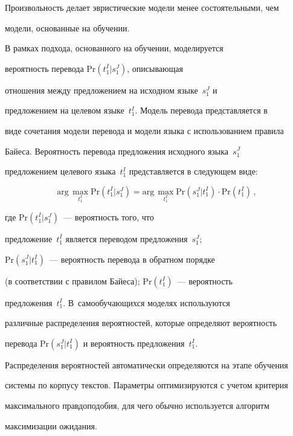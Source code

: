 Произвольность делает эвристические модели менее состоятельными, чем


модели, основанные на обучении.





     В рамках подхода, основанного на обучении, моделируется


вероятность перевода $\mathrm{Pr}\left( t_1^I\vert s_1^J\right)$, описывающая


отношения между предложением на исходном языке~$s_1^J$ и


предложением на целевом языке~$t_1^I$. Модель перевода представляется в


виде сочетания модели перевода и модели языка с использованием правила


Байеса. Вероятность перевода предложения исходного языка~$s_1^J$


предложением целевого языка~$t_1^I$ представляется в следующем виде:


     $$


     \mathrm{arg}\,\max_{t_1^I} \mathrm{Pr}\left( t_1^I\vert s_1^J\right) =


\mathrm{arg}\,\max_{t_1^I} \mathrm{Pr}\left( s_1^J\vert t_1^I\right)\cdot


\mathrm{Pr}(t_1^I)\,,


     $$


где $\mathrm{Pr}\left( t_1^I\vert s_1^J\right)$~--- вероятность того, что


предложение~$t_1^I$ является переводом предложения~$s_1^J$;


$\mathrm{Pr}(s_1^J\vert t_1^I)$~--- вероятность перевода в обратном порядке


(в соответствии с правилом Байеса); $\mathrm{Pr}(t_1^I)$~--- вероятность


предложения~$t_1^I$. В~самообучающихся моделях используются


различные распределения вероятностей, которые определяют вероятность


перевода $\mathrm{Pr}(s_1^J\vert t_1^I)$ и вероятность предложения~$t_1^I$.


Распределения вероятностей автоматически определяются на этапе обучения


системы по корпусу текстов. Параметры оптимизируются с учетом критерия


максимального правдоподобия, для чего обычно используется алгоритм


максимизации ожидания.






